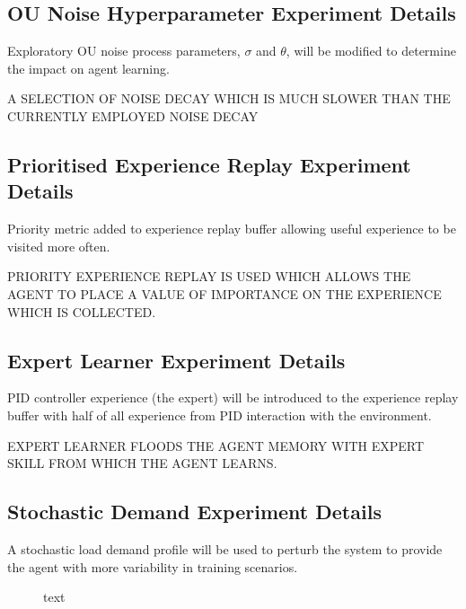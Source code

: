 \subsection{OU Noise Hyperparameter Experiment Details}
Exploratory OU noise process parameters, $\sigma$ and $\theta$, will be modified to determine the impact on agent learning.

A SELECTION OF NOISE DECAY WHICH IS MUCH SLOWER THAN THE CURRENTLY EMPLOYED NOISE DECAY

\subsection{Prioritised Experience Replay Experiment Details}
Priority metric added to experience replay buffer allowing useful experience  to be visited more often.

PRIORITY EXPERIENCE REPLAY IS USED WHICH ALLOWS THE AGENT TO PLACE A VALUE OF IMPORTANCE ON THE EXPERIENCE WHICH IS COLLECTED.

\subsection{Expert Learner Experiment Details}
PID controller experience (the expert) will be introduced to the experience replay buffer with half of all experience from PID interaction with the environment.

EXPERT LEARNER FLOODS THE AGENT MEMORY WITH EXPERT SKILL FROM WHICH THE AGENT LEARNS.

\subsection{Stochastic Demand Experiment Details}
A stochastic load demand profile will be used to perturb the system to provide the agent with more variability in training scenarios.

\begin{figure}[h]
	\centering
	
	\caption{text}
\end{figure}

